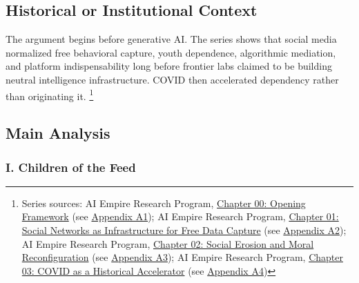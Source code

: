 \documentclass[
  american,
  11pt,
  letterpaper,
]{article}
\begin{document}
\subsection{Historical or Institutional
Context}\label{historical-or-institutional-context}

The argument begins before generative AI. The series shows that social
media normalized free behavioral capture, youth dependence, algorithmic
mediation, and platform indispensability long before frontier labs
claimed to be building neutral intelligence infrastructure. COVID then
accelerated dependency rather than originating it. \footnote{Series
  sources: AI Empire Research Program,
  \href{00_opening-framework_paper.html}{Chapter 00: Opening Framework}
  (see \hyperref[appendix-a1-chapter-00-opening-framework]{Appendix
  A1}); AI Empire Research Program,
  \href{01_social-networks-data-capture_paper.html}{Chapter 01: Social
  Networks as Infrastructure for Free Data Capture} (see
  \hyperref[appendix-a2-chapter-01-social-networks-as-infrastructure-for-free-data-capture]{Appendix
  A2}); AI Empire Research Program,
  \href{02_social-erosion-and-moral-reconfiguration_paper.html}{Chapter
  02: Social Erosion and Moral Reconfiguration} (see
  \hyperref[appendix-a3-chapter-02-social-erosion-and-moral-reconfiguration]{Appendix
  A3}); AI Empire Research Program,
  \href{03_covid-historical-accelerator_paper.html}{Chapter 03: COVID as
  a Historical Accelerator} (see
  \hyperref[appendix-a4-chapter-03-covid-as-a-historical-accelerator]{Appendix
  A4})}

\subsection{Main Analysis}\label{main-analysis}

\subsubsection{I. Children of the Feed}\label{i.-children-of-the-feed}
\end{document}
